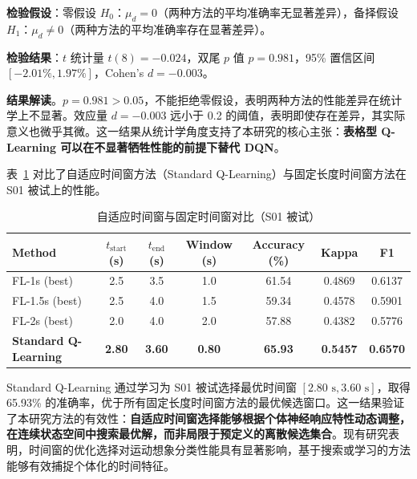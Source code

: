 \textbf{检验假设}：零假设 $H_0$：$\mu_d = 0$（两种方法的平均准确率无显著差异），备择假设 $H_1$：$\mu_d \neq 0$（两种方法的平均准确率存在显著差异）。

\textbf{检验结果}：$t$ 统计量 $t(8) = -0.024$，双尾 $p$ 值 $p = 0.981$，95\% 置信区间 $[-2.01\%, 1.97\%]$，Cohen's $d = -0.003$。

\textbf{结果解读}。$p = 0.981 > 0.05$，不能拒绝零假设，表明两种方法的性能差异在统计学上不显著。效应量 $d = -0.003$ 远小于 0.2 的阈值，表明即使存在差异，其实际意义也微乎其微。这一结果从统计学角度支持了本研究的核心主张：\textbf{表格型 Q-Learning 可以在不显著牺牲性能的前提下替代 DQN}。

\label{subsec:adaptive_vs_fixed}

表~\ref{tab:adaptive_fixed_s01} 对比了自适应时间窗方法（Standard Q-Learning）与固定长度时间窗方法在 S01 被试上的性能。

\begin{table}[H]
\centering
\caption{自适应时间窗与固定时间窗对比（S01 被试）}
\label{tab:adaptive_fixed_s01}
\small
\begin{tabular}{lcccccc}
\hline
\textbf{Method} & \textbf{$t_{\text{start}}$ (s)} & \textbf{$t_{\text{end}}$ (s)} & \textbf{Window (s)} & \textbf{Accuracy (\%)} & \textbf{Kappa} & \textbf{F1} \\
\hline
FL-1s (best) & 2.5 & 3.5 & 1.0 & 61.54 & 0.4869 & 0.6137 \\
FL-1.5s (best) & 2.5 & 4.0 & 1.5 & 59.34 & 0.4578 & 0.5901 \\
FL-2s (best) & 2.0 & 4.0 & 2.0 & 57.88 & 0.4382 & 0.5776 \\
\textbf{Standard Q-Learning} & \textbf{2.80} & \textbf{3.60} & \textbf{0.80} & \textbf{65.93} & \textbf{0.5457} & \textbf{0.6570} \\
\hline
\end{tabular}
\end{table}

Standard Q-Learning 通过学习为 S01 被试选择最优时间窗 $[2.80\text{ s}, 3.60\text{ s}]$，取得 65.93\% 的准确率，优于所有固定长度时间窗方法的最优候选窗口。这一结果验证了本研究方法的有效性：\textbf{自适应时间窗选择能够根据个体神经响应特性动态调整，在连续状态空间中搜索最优解，而非局限于预定义的离散候选集合}。现有研究表明，时间窗的优化选择对运动想象分类性能具有显著影响，基于搜索或学习的方法能够有效捕捉个体化的时间特征\cite{yang2015time, chen2019dynamic, zhang2021mars}。

\label{subsec:tableq_dqn_discussion}

